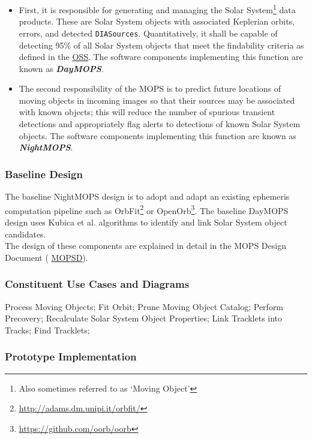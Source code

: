 \documentclass[12pt]{article}
\newcommand{\code}[1]{\texttt{#1}}
\newcommand{\DIASources}{\code{DIASources}\xspace}
\newcommand{\ds}[2]{{\color{blue} \href{https://docushare.lsstcorp.org/docushare/dsweb/Get/#1}{#2}}\xspace}
\newcommand{\OSS}{\ds{LSE-30}{OSS}}
\newcommand{\MOPSD}{\ds{LDM-156}{MOPSD}}
\begin{document}
\begin{itemize}
    \item First, it is responsible for generating and managing the Solar System\footnote{Also sometimes referred to as `Moving Object'} data products. These are Solar System objects with associated Keplerian orbits, errors, and detected \DIASources. Quantitatively, it shall be capable of detecting 95\% of all Solar System objects that meet the findability criteria as defined in the \OSS\@. The software components implementing this function are known as {\bf \em DayMOPS}.
    \item The second responsibility of the MOPS is to predict future locations of moving objects in incoming images so that their sources may be associated with known objects; this will reduce the number of spurious transient detections and appropriately flag alerts to detections of known Solar System objects.  The software components implementing this function are known as {\bf \em NightMOPS}.
\end{itemize}

\subsubsection{Baseline Design}

The baseline NightMOPS design is to adopt and adapt an existing ephemeris computation pipeline such as OrbFit\footnote{\url{http://adams.dm.unipi.it/orbfit/}} or OpenOrb\footnote{\url{https://github.com/oorb/oorb}}. The baseline DayMOPS design uses Kubica et al. \cite{Kubica05} algorithms to identify and link Solar System object candidates.
\\

The design of these components are explained in detail in the MOPS Design Document (\MOPSD).

\subsubsection{Constituent Use Cases and Diagrams}

Process Moving Objects;
Fit Orbit; Prune Moving Object Catalog; Perform Precovery; Recalculate Solar System Object Properties; Link Tracklets into Tracks; Find Tracklets;

\subsubsection{Prototype Implementation}
\end{document}
